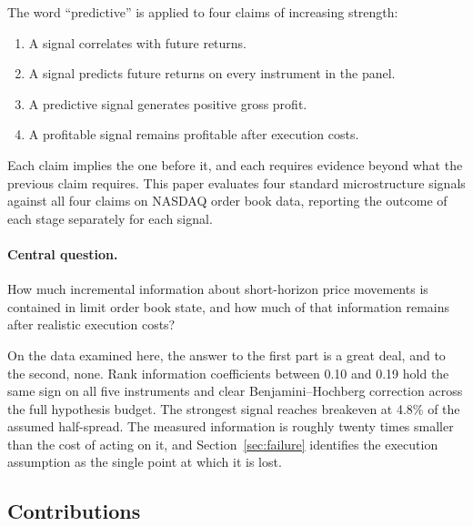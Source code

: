 \documentclass[11pt]{scrartcl}
\begin{document}
The word ``predictive'' is applied to four claims of increasing strength:

\begin{enumerate}[label=(\arabic*)]
\item A signal correlates with future returns.
\item A signal predicts future returns on every instrument in the panel.
\item A predictive signal generates positive gross profit.
\item A profitable signal remains profitable after execution costs.
\end{enumerate}

Each claim implies the one before it, and each requires evidence beyond what the previous claim requires. This paper evaluates four standard microstructure signals against all four claims on NASDAQ order book data, reporting the outcome of each stage separately for each signal.

\paragraph{Central question.} How much incremental information about short-horizon price movements is contained in limit order book state, and how much of that information remains after realistic execution costs?

On the data examined here, the answer to the first part is a great deal, and to the second, none. Rank information coefficients between 0.10 and 0.19 hold the same sign on all five instruments and clear Benjamini--Hochberg correction across the full hypothesis budget. The strongest signal reaches breakeven at 4.8\% of the assumed half-spread. The measured information is roughly twenty times smaller than the cost of acting on it, and Section~\ref{sec:failure} identifies the execution assumption as the single point at which it is lost.

\subsection{Contributions}
\label{sec:contributions}
\end{document}
